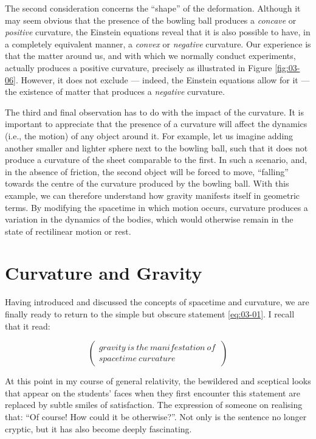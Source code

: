 The second consideration concerns the ``shape'' of the deformation. Although it may seem
obvious that the presence of the bowling ball produces a \emph{concave} or
\emph{positive} curvature, the Einstein equations reveal that it is also possible to
have, in a completely equivalent manner, a \emph{convex} or \emph{negative} curvature.
Our experience is that the matter around us, and with which we normally conduct
experiments, actually produces a positive curvature, precisely as illustrated in Figure
\ref{fig:03-06}. However, it does not exclude --- indeed, the Einstein equations allow for it ---
the existence of matter that produces a \emph{negative} curvature.

The third and final observation has to do with the impact of the curvature. It is
important to appreciate that the presence of a curvature will affect the dynamics (i.e.,
the motion) of any object around it. For example, let us imagine adding another smaller
and lighter sphere next to the bowling ball, such that it does not produce a curvature
of the sheet comparable to the first. In such a scenario, and, in the absence of
friction, the second object will be forced to move, ``falling'' towards the centre of
the curvature produced by the bowling ball. With this example, we can therefore
understand how gravity manifests itself in geometric terms. By modifying the spacetime
in which motion occurs, curvature produces a variation in the dynamics of the bodies,
which would otherwise remain in the state of rectilinear motion or rest.

\section{Curvature and Gravity}\label{sec:03-gravity}

Having introduced and discussed the concepts of spacetime and curvature, we are finally
ready to return to the simple but obscure statement \eqref{eq:03-01}. I recall that it read:

\[\begin{pmatrix}
gravity\ is\ the\ manifestation\ of\  \\
spacetime\ curvature
\end{pmatrix}\]

At this point in my course of general relativity, the bewildered and sceptical looks
that appear on the students' faces when they first encounter this statement are replaced
by subtle smiles of satisfaction. The expression of someone on realising that: ``Of
course! How could it be otherwise?''. Not only is the sentence no longer cryptic, but it
has also become deeply fascinating.

